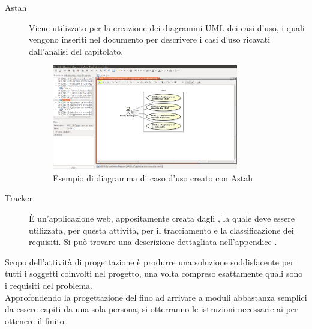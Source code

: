 			\begin{description}
				\item[Astah] Viene utilizzato per la creazione dei diagrammi UML dei casi d'uso, i quali vengono inseriti nel documento  per descrivere i casi d'uso ricavati dall'analisi del capitolato.
				\begin{figure}[H]
					\centering
					\includegraphics[width=0.8\textwidth]{NormeDiProgetto/Pics/CasoDusoAstah.png}
					\caption{Esempio di diagramma di caso d'uso creato con Astah}
				\end{figure}
				\item[Tracker] È un'applicazione web, appositamente creata dagli , la quale deve essere utilizzata, per questa attività, per il tracciamento e la classificazione dei requisiti. Si può trovare una descrizione dettagliata nell'appendice .
			\end{description}
		Scopo dell'attività di progettazione è produrre una soluzione soddisfacente per tutti i soggetti coinvolti nel progetto, una volta compreso esattamente quali sono i requisiti del problema. \\
		Approfondendo la progettazione del  fino ad arrivare a moduli abbastanza semplici da essere capiti da una sola persona, si otterranno le istruzioni necessarie ai  per ottenere il  finito.
			

